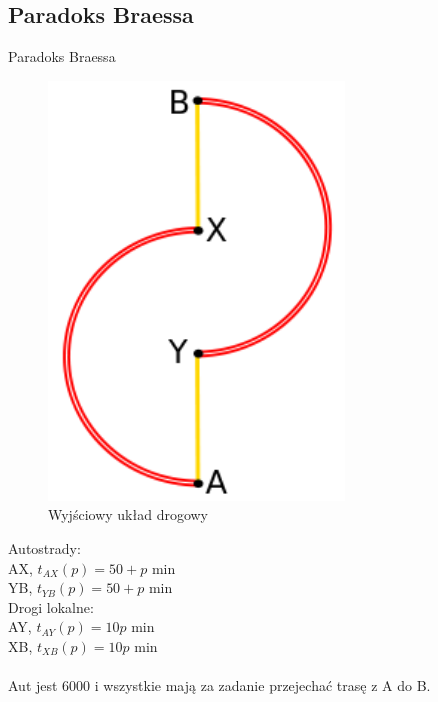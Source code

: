 \documentclass{beamer}
\begin{document}
\subsection{Paradoks Braessa }
\begin{frame}{Paradoks Braessa\cite{braess}}

\centering
\begin{minipage}{.48\textwidth}
\begin{figure}[h!]
\includegraphics[width=0.7\textwidth]{img/braess1}
\caption{Wyjściowy układ drogowy}
\end{figure}
\end{minipage}\hfill
\begin{minipage}{.48\textwidth}

Autostrady:\\
AX, $t_{AX}(p) =  50 + p$ min\\
YB, $t_{YB}(p) =  50 + p$ min\\

Drogi lokalne:\\
AY, $t_{AY}(p) =  10p$ min\\
XB, $t_{XB}(p) =  10p$ min\\
\\
Aut jest 6000 i wszystkie mają za zadanie przejechać trasę z A do B.

\end{minipage}\hfill

\end{frame}
\end{document}
